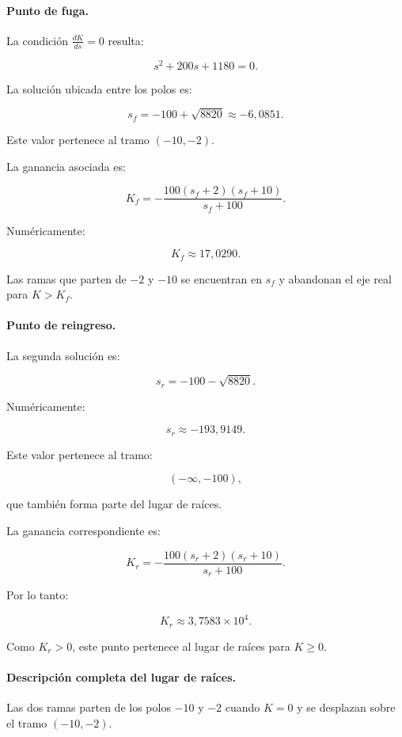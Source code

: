 \documentclass[12pt,a4paper]{article}
\begin{document}
\paragraph{Punto de fuga.}

La condición $\frac{dK}{ds}=0$ resulta:

\[
s^2+200s+1180=0.
\]

La solución ubicada entre los polos es:

\[
\boxed{
s_f
=
-100+\sqrt{8820}
\approx-6{,}0851.
}
\]

Este valor pertenece al tramo $(-10,-2)$.

La ganancia asociada es:

\[
K_f
=
-\frac{
100(s_f+2)(s_f+10)
}{
s_f+100
}.
\]

Numéricamente:

\[
\boxed{
K_f\approx17{,}0290.
}
\]

Las ramas que parten de $-2$ y $-10$ se encuentran
en $s_f$ y abandonan el eje real para $K>K_f$.


\paragraph{Punto de reingreso.}

La segunda solución es:

\[
s_r
=
-100-\sqrt{8820}.
\]

Numéricamente:

\[
\boxed{
s_r\approx-193{,}9149.
}
\]

Este valor pertenece al tramo:

\[
(-\infty,-100),
\]

que también forma parte del lugar de raíces.

La ganancia correspondiente es:

\[
K_r
=
-\frac{
100(s_r+2)(s_r+10)
}{
s_r+100
}.
\]

Por lo tanto:

\[
\boxed{
K_r\approx3{,}7583\times10^4.
}
\]

Como $K_r>0$, este punto pertenece al lugar de raíces
para $K\geq0$.


\paragraph{Descripción completa del lugar de raíces.}

Las dos ramas parten de los polos $-10$ y $-2$ cuando
$K=0$ y se desplazan sobre el tramo $(-10,-2)$.
\end{document}
